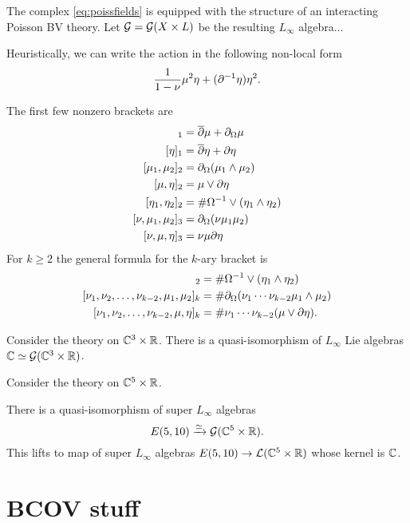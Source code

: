 \documentclass[11pt]{amsart}
\begin{document}
\begin{prop}
The complex \eqref{eq:poissfields} is equipped with the structure of an interacting Poisson BV theory.
Let $\mathcal G = \mathcal G(X \times L)$ be the resulting $L_\infty$ algebra...
\end{prop}

Heuristically, we can write the action in the following non-local form
\[
\frac{1}{1-\nu} \mu^2 \eta + (\partial^{-1} \eta) \eta^2 .
\]

The first few nonzero brackets are
\begin{align*}
[\mu]_1 & = \dbar \mu + \div \mu \\
[\eta]_1 & = \dbar \eta + \del \eta \\ 
[\mu_1,\mu_2]_2 & = \div (\mu_1 \wedge \mu_2) \\
[\mu, \eta]_2 & = \mu \vee \del \eta \\
[\eta_1,\eta_2]_2 & = \# \Omega^{-1} \vee (\eta_1 \wedge \eta_2)  \\
[\nu, \mu_1,\mu_2]_3 & = \div(\nu \mu_1 \mu_2) \\
[\nu, \mu,\eta]_3 & = \nu \mu \del \eta
\end{align*}
For $k \geq 2$ the general formula for the $k$-ary bracket is 
\begin{align*}
[\eta_1,\eta_2]_2 & = \# \Omega^{-1} \vee (\eta_1 \wedge \eta_2)  \\
[\nu_1,\nu_2, \ldots, \nu_{k-2}, \mu_1,\mu_2]_{k} & = \# \div(\nu_1 \cdots \nu_{k-2} \mu_1 \wedge \mu_2) \\ 
[\nu_1,\nu_2, \ldots, \nu_{k-2}, \mu,\eta]_{k} & = \# \nu_1 \cdots \nu_{k-2} (\mu \vee \del \eta) .
\end{align*}

\parsec[]
Consider the theory on $\mathbb C^3 \times \mathbb R$. 
There is a quasi-isomorphism of $L_\infty$ Lie algebras $\mathbb C \simeq \mathcal G (\mathbb C^3 \times \mathbb R)$. 

\parsec[]
Consider the theory on $\mathbb C^5 \times \mathbb R$. 

\begin{prop}
There is a quasi-isomorphism of super $L_\infty$ algebras 
\[
E(5,10) \xrightarrow{\simeq} \mathcal G(\mathbb C^5 \times \mathbb R) .
\]
This lifts to map of super $L_\infty$ algebras $E(5,10) \to \mathcal L(\mathbb C^5 \times \mathbb R)$ whose kernel is $\mathbb C$.
\end{prop}


\section{BCOV stuff}
\end{document}
